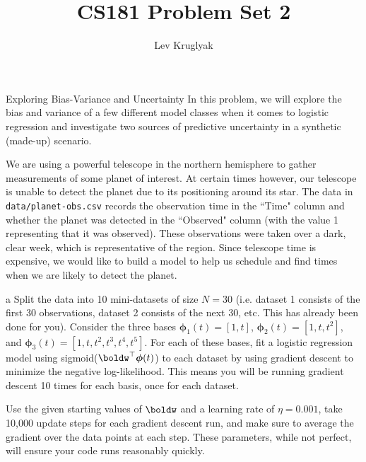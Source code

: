 \documentclass[expanded]{lkx_pset}
\title{CS181 Problem Set 2}
\author{Lev Kruglyak}
\begin{document}
\maketitle

\begin{problem}{1}{Exploring Bias-Variance and Uncertainty}
In this problem, we will explore the bias and variance of a few
different model classes when it comes to logistic regression and
investigate two sources of predictive uncertainty in a synthetic
(made-up) scenario.
\end{problem}

\begin{parts}
	\begin{part}{}
		We are using a powerful telescope in the northern hemisphere to gather
		measurements of some planet of interest. At certain times however, our
		telescope is unable to detect the planet due to its positioning around
		its star.  The data in \verb|data/planet-obs.csv| records the
		observation time in the ``Time" column and whether the planet was
		detected in the ``Observed" column (with the value 1 representing that
		it was observed).  These observations were taken over a dark, clear
		week, which is representative of the region.  Since telescope time is
		expensive, we would like to build a model to help us schedule and find
		times when we are likely to detect the planet.
	\end{part}

	\begin{part}{a}
		Split the data into 10 mini-datasets of size $N = 30$ (i.e. dataset 1 consists of the first 30 observations, dataset 2 consists of the next 30, etc. This has already been done for you).
		Consider the three bases $\boldsymbol\phi_1(t) = [1, t]$, $\boldsymbol\phi_2(t) = [1, t, t^2]$, and $\boldsymbol\phi_3(t) = [1, t, t^2, t^3, t^4, t^5]$. For each of these bases, fit a logistic regression model using sigmoid($\boldw^\top \boldsymbol\phi(t)$) to each dataset by using gradient descent to
		minimize the negative log-likelihood.  This means you will be
		running gradient descent 10 times for each basis, once for each
		dataset.

		Use the given starting values of $\boldw$ and a learning rate of $\eta=0.001$, take 10,000 update
		steps for each gradient descent run, and make sure to average the
		gradient over the data points at each step. These parameters,
		while not perfect, will ensure your code runs reasonably quickly.
	\end{part}
\end{parts}
\end{document}
